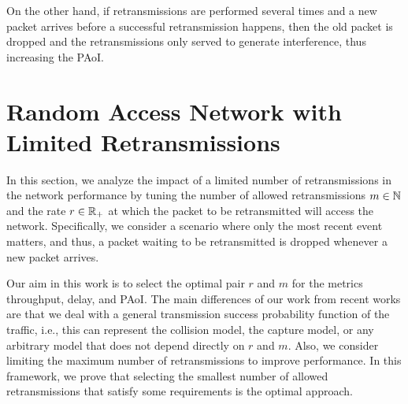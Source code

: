On the other hand, if retransmissions are performed several times and a new packet arrives before a successful retransmission happens, then the old packet is dropped and the retransmissions only served to generate interference, thus increasing the PAoI.
%

\section{Random Access Network with Limited Retransmissions}

In this section, we analyze the impact of a limited number of retransmissions in the network performance by tuning the number of allowed retransmissions $m\in{\mathbb N}$ and the rate $r\in{\mathbb R}_+$ at which the packet to be retransmitted will access the network.
%
Specifically, we consider a scenario where only the most recent event matters, and thus, a packet waiting to be retransmitted is dropped whenever a new packet arrives.

Our aim in this work is to select the optimal pair $r$ and $m$ for the metrics throughput, delay, and PAoI.
%
The main differences of our work from recent works {\cite{chen2020age1, chen2020age2, yates2017status}} are that we deal with a general transmission success probability function of the traffic, i.e., this can represent the collision model, the capture model, or any arbitrary model that does not depend directly on $r$ and $m$. Also, we consider limiting the maximum number of retransmissions to improve performance.
%
In this framework, we prove that selecting the smallest number of allowed retransmissions that satisfy some requirements is the optimal approach.


